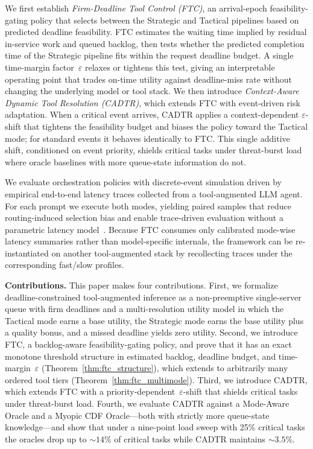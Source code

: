 \documentclass[fleqn,12pt,lineno]{wlpeerj}
\begin{document}
We first establish \emph{Firm-Deadline Tool Control (FTC)}, an arrival-epoch feasibility-gating policy that selects between the Strategic and Tactical pipelines based on predicted deadline feasibility. FTC estimates the waiting time implied by residual in-service work and queued backlog, then tests whether the predicted completion time of the Strategic pipeline fits within the request deadline budget. A single time-margin factor~$\varepsilon$ relaxes or tightens this test, giving an interpretable operating point that trades on-time utility against deadline-miss rate without changing the underlying model or tool stack. We then introduce \emph{Context-Aware Dynamic Tool Resolution (CADTR)}, which extends FTC with event-driven risk adaptation. When a critical event arrives, CADTR applies a context-dependent $\varepsilon$-shift that tightens the feasibility budget and biases the policy toward the Tactical mode; for standard events it behaves identically to FTC. This single additive shift, conditioned on event priority, shields critical tasks under threat-burst load where oracle baselines with more queue-state information do not.

We evaluate orchestration policies with discrete-event simulation driven by empirical end-to-end latency traces collected from a tool-augmented LLM agent. For each prompt we execute both modes, yielding paired samples that reduce routing-induced selection bias and enable trace-driven evaluation without a parametric latency model~\cite{agrawal2024vidur}. Because FTC consumes only calibrated mode-wise latency summaries rather than model-specific internals, the framework can be re-instantiated on another tool-augmented stack by recollecting traces under the corresponding fast/slow profiles.

\noindent\textbf{Contributions.} This paper makes four contributions. First, we formalize deadline-constrained tool-augmented inference as a non-preemptive single-server queue with firm deadlines and a multi-resolution utility model in which the Tactical mode earns a base utility, the Strategic mode earns the base utility plus a quality bonus, and a missed deadline yields zero utility. Second, we introduce FTC, a backlog-aware feasibility-gating policy, and prove that it has an exact monotone threshold structure in estimated backlog, deadline budget, and time-margin~$\varepsilon$ (Theorem~\ref{thm:ftc_structure}), which extends to arbitrarily many ordered tool tiers (Theorem~\ref{thm:ftc_multimode}). Third, we introduce CADTR, which extends FTC with a priority-dependent~$\varepsilon$-shift that shields critical tasks under threat-burst load. Fourth, we evaluate CADTR against a Mode-Aware Oracle and a Myopic CDF Oracle---both with strictly more queue-state knowledge---and show that under a nine-point load sweep with 25\% critical tasks the oracles drop up to ${\sim}14\%$ of critical tasks while CADTR maintains ${\sim}3.5\%$.
\end{document}
